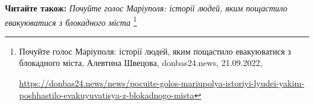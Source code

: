 
 
 
 
 

\textbf{Читайте також:} \emph{Почуйте голос Маріуполя: історії людей, яким пощастило евакуюватися з блокадного міста }%
\footnote{Почуйте голос Маріуполя: історії людей, яким пощастило евакуюватися з блокадного міста, Алевтина Швецова, donbas24.news, 21.09.2022, \par%
\url{https://donbas24.news/news/pocuite-golos-mariupolya-istoriyi-lyudei-yakim-poshhastilo-evakuyuvatisya-z-blokadnogo-mista}%
}
